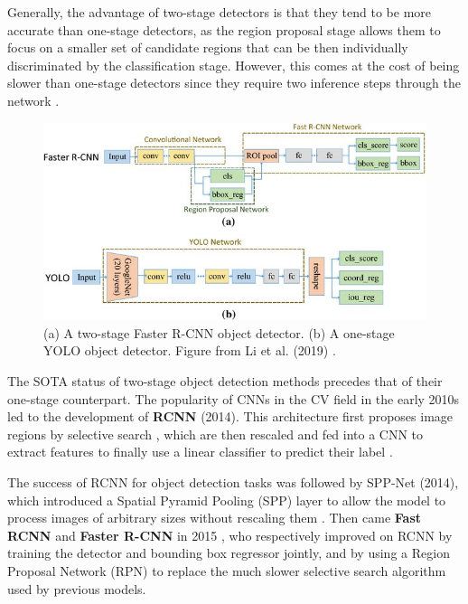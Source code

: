 \documentclass[../main.tex]{subfiles}
\begin{document}
    
    
    Generally, the advantage of two-stage detectors is that they tend to be more accurate than one-stage detectors, as the region proposal stage allows them to focus on a smaller set of candidate regions that can be then individually discriminated by the classification stage. However, this comes at the cost of being slower than one-stage detectors since they require two inference steps through the network \cite{zouObjectDetection202023b}.
    
    \begin{figure}[h]
        \centering
        \includegraphics[width=0.95\linewidth]{figures/fastrcnn_vs_yolo}
        \caption{(a) A two-stage Faster R-CNN object detector. (b) A one-stage YOLO object detector. Figure from Li et al. (2019) \cite{liEnhancedBirdDetection2019}.
        }
        \label{fig:fastrcnn_vs_yolo}
    \end{figure}

    The SOTA status of two-stage object detection methods precedes that of their one-stage counterpart. The popularity of CNNs in the CV field in the early 2010s led to the development of \textbf{RCNN} (2014). This architecture first proposes image regions by selective search \cite{uijlingsSelectiveSearchObject2013}, which are then rescaled and fed into a CNN to extract features to finally use a linear classifier to predict their label \cite{girshickRichFeatureHierarchies2014}. 
    
    The success of RCNN for object detection tasks was followed by SPP-Net (2014), which introduced a Spatial Pyramid Pooling (SPP) layer to allow the model to process images of arbitrary sizes without rescaling them \cite{heSpatialPyramidPooling2014}. Then came \textbf{Fast RCNN} and \textbf{Faster R-CNN} in 2015 \cite{girshickFastRCNN2015,renFasterRCNNRealTime2016}, who respectively improved on RCNN by training the detector and bounding box regressor jointly, and by using a Region Proposal Network (RPN) to replace the much slower selective search algorithm used by previous models. 
    
\end{document}
